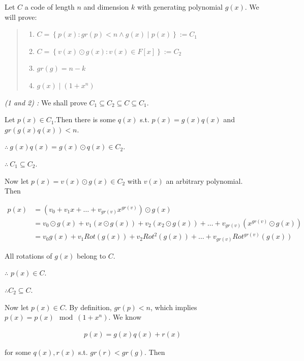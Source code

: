 \documentclass[a4paper, 12pt]{article}
\begin{document}
Let $C$ a code of length $n$ and dimension $k$ with generating polynomial 
$g(x)$. We will prove: 


\small
\begin{quote}

\begin{enumerate}
    \item $C = \left\{ p(x) : gr(p) < n \land  g(x) \mid p(x) \right\} := C_1$
    \item $C = \left\{ v(x) \odot g(x) : v(x) \in F[x] \right\} := C_2$ 
    \item $gr(g) = n - k$
    \item $g(x) \mid (1 + x^n)$
\end{enumerate}

\end{quote}
\normalsize

\textit{(1 and 2) :} We shall prove $C_1 \subseteq C_2 \subseteq C \subseteq C_1$.

Let $p(x) \in C_1$.Then there is some $q(x)$ s.t. $p(x) = g(x) q(x)$ and 
$gr \left( g(x)q(x) \right) < n $.

$\therefore ~ g(x) q(x) = g(x) \odot q(x) \in C_2$.

$\therefore ~ C_1 \subseteq C_2$.

Now let $p(x) = v(x) \odot g(x) \in C_2$ with $v(x)$ an arbitrary polynomial.
Then

\begin{align*}
    p(x) &= \left( v_0 + v_1x + \ldots + v_{gr(v)} x^{gr(v)} \right)  \odot g(x) \\ 
         &= v_0 \odot g(x) + v_1 \left( x \odot g(x) \right)  + v_2 \left( x_2 \odot g(x) \right)  + \ldots + v_{gr(v)} \left( x^{gr(v)} \odot g(x) \right)  \\ 
         &= v_0 g(x) + v_1 Rot\left( g(x) \right)  + v_2 Rot^2\left( g(x) \right)  + \ldots  +v_{gr(v)} Rot^{gr(v)}\left( g(x) \right)  
\end{align*}

All rotations of $g(x)$ belong to $C$. 

$\therefore $ $p(x) \in C$.

$\therefore C_2 \subseteq C$.

Now let $p(x) \in C$. By definition, $gr(p) < n$, which implies $p(x) = p(x)
\mod (1 + x^n)$. We know

\begin{align*}
    p(x) = g(x) q(x) + r(x)
\end{align*}

for some $q(x), r(x)$ s.t. $gr(r) < gr(g)$. Then
\end{document}
